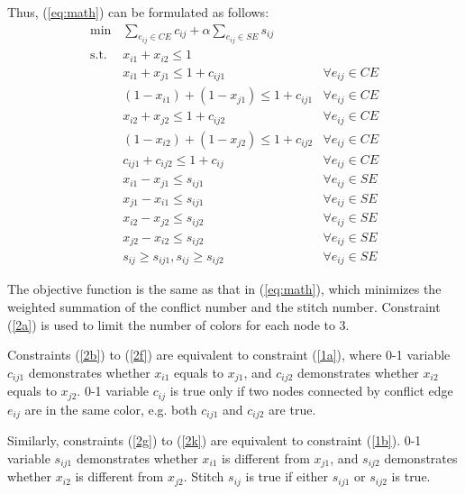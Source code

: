 \documentclass[10pt,conference]{IEEEtran}
\begin{document}
Thus, (\ref{eq:math}) can be formulated as follows:
\begin{align}
	\textrm{min}  &       \sum_{e_{ij} \in CE} c_{ij} + \alpha \sum_{e_{ij} \in SE}s_{ij}& 		\label{eq:ILP}\\
	\textrm{s.t}.\ \	&	x_{i1} + x_{i2} \le 1										\label{2a}\tag{$2a$}\\
				&	x_{i1} + x_{j1} \le 1 + c_{ij1}                 		&\forall e_{ij} \in CE  	\label{2b}\tag{$2b$}\\
				&	(1-x_{i1})+(1-x_{j1}) \le 1 + c_{ij1}		&\forall e_{ij} \in CE   	\label{2c}\tag{$2c$}\\
				&	x_{i2} + x_{j2} \le 1 + c_{ij2}			&\forall e_{ij} \in CE  	\label{2d}\tag{$2d$}\\
				&	(1-x_{i2})+(1-x_{j2}) \le 1 + c_{ij2}		&\forall e_{ij} \in CE   	\label{2e}\tag{$2e$}\\
				&	c_{ij1} + c_{ij2} \le 1 + c_{ij} 			&\forall e_{ij} \in CE		\label{2f}\tag{$2f$}\\
				&	x_{i1} - x_{j1} \le s_{ij1}            			&\forall e_{ij} \in SE  		\label{2g}\tag{$2g$}\\
				&	x_{j1} - x_{i1} \le s_{ij1}				&\forall e_{ij} \in SE  		\label{2h}\tag{$2h$}\\
				&	x_{i2} - x_{j2} \le s_{ij2}            			&\forall e_{ij} \in SE  		\label{2i}	\tag{$2i$}\\
				&	x_{j2} - x_{i2} \le s_{ij2}				&\forall e_{ij} \in SE  		\label{2j}	\tag{$2j$}\\
				&	s_{ij} \ge s_{ij1}, s_{ij} \ge s_{ij2}			&\forall e_{ij} \in SE		\label{2k}\tag{$2k$}
\end{align}

The objective function is the same as that in (\ref{eq:math}), which minimizes the weighted summation of the conflict number and the stitch number.
Constraint (\ref{2a}) is used to limit the number of colors for each node to 3.


Constraints (\ref{2b}) to (\ref{2f}) are equivalent to constraint (\ref{1a}), where 0-1 variable $c_{ij1}$ demonstrates whether $x_{i1}$ equals to $x_{j1}$, and $c_{ij2}$ demonstrates whether $x_{i2}$ equals to $x_{j2}$.
0-1 variable $c_{ij}$ is true only if two nodes connected by conflict edge $e_{ij}$ are in the same color, e.g. both $c_{ij1}$ and $c_{ij2}$ are true.


Similarly, constraints (\ref{2g}) to (\ref{2k}) are equivalent to constraint (\ref{1b}). 0-1 variable $s_{ij1}$ demonstrates whether $x_{i1}$ is different from $x_{j1}$, and $s_{ij2}$ demonstrates whether $x_{i2}$ is different from $x_{j2}$.
Stitch $s_{ij}$ is true if either $s_{ij1}$ or $s_{ij2}$ is true.
\end{document}
